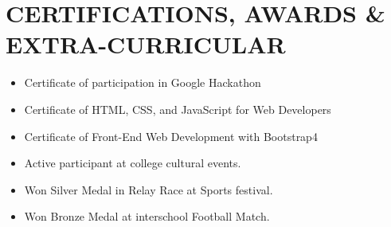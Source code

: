 \documentclass[letterpaper,11pt]{article}
\newcommand{\achievementItem}[1]{
  \item\small{
    {#1 \vspace{-6pt}}
  }
}
\newcommand{\resumeSubHeadingListEnd}{\end{itemize}}
\begin{document}
\section{CERTIFICATIONS, AWARDS \& EXTRA-CURRICULAR}

\begin{itemize}[leftmargin=0.2in]
  \achievementItem{Certificate of participation in Google Hackathon}
  \achievementItem{Certificate of HTML, CSS, and JavaScript for Web Developers}
  \achievementItem{Certificate of Front-End Web Development with Bootstrap4}
  \achievementItem{Active participant at college cultural events.}
  \achievementItem{Won Silver Medal in Relay Race at Sports festival.}
  \achievementItem{Won Bronze Medal at interschool Football Match.}
\end{itemize}
        
\end{document}
